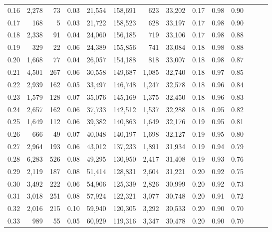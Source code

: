 \begin{tabular}{rrrrrrrrrrrrrr}
0.16 &   2,278 &     73 &  0.03 &   21,554 &  158,691 &     623 &  33,202 &  0.17 &  0.98 &      0.90 \\
0.17 &     168 &      5 &  0.03 &   21,722 &  158,523 &     628 &  33,197 &  0.17 &  0.98 &      0.90 \\
0.18 &   2,338 &     91 &  0.04 &   24,060 &  156,185 &     719 &  33,106 &  0.17 &  0.98 &      0.88 \\
0.19 &     329 &     22 &  0.06 &   24,389 &  155,856 &     741 &  33,084 &  0.18 &  0.98 &      0.88 \\
0.20 &   1,668 &     77 &  0.04 &   26,057 &  154,188 &     818 &  33,007 &  0.18 &  0.98 &      0.87 \\
0.21 &   4,501 &    267 &  0.06 &   30,558 &  149,687 &   1,085 &  32,740 &  0.18 &  0.97 &      0.85 \\
0.22 &   2,939 &    162 &  0.05 &   33,497 &  146,748 &   1,247 &  32,578 &  0.18 &  0.96 &      0.84 \\
0.23 &   1,579 &    128 &  0.07 &   35,076 &  145,169 &   1,375 &  32,450 &  0.18 &  0.96 &      0.83 \\
0.24 &   2,657 &    162 &  0.06 &   37,733 &  142,512 &   1,537 &  32,288 &  0.18 &  0.95 &      0.82 \\
0.25 &   1,649 &    112 &  0.06 &   39,382 &  140,863 &   1,649 &  32,176 &  0.19 &  0.95 &      0.81 \\
0.26 &     666 &     49 &  0.07 &   40,048 &  140,197 &   1,698 &  32,127 &  0.19 &  0.95 &      0.80 \\
0.27 &   2,964 &    193 &  0.06 &   43,012 &  137,233 &   1,891 &  31,934 &  0.19 &  0.94 &      0.79 \\
0.28 &   6,283 &    526 &  0.08 &   49,295 &  130,950 &   2,417 &  31,408 &  0.19 &  0.93 &      0.76 \\
0.29 &   2,119 &    187 &  0.08 &   51,414 &  128,831 &   2,604 &  31,221 &  0.20 &  0.92 &      0.75 \\
0.30 &   3,492 &    222 &  0.06 &   54,906 &  125,339 &   2,826 &  30,999 &  0.20 &  0.92 &      0.73 \\
0.31 &   3,018 &    251 &  0.08 &   57,924 &  122,321 &   3,077 &  30,748 &  0.20 &  0.91 &      0.72 \\
0.32 &   2,016 &    215 &  0.10 &   59,940 &  120,305 &   3,292 &  30,533 &  0.20 &  0.90 &      0.70 \\
0.33 &     989 &     55 &  0.05 &   60,929 &  119,316 &   3,347 &  30,478 &  0.20 &  0.90 &      0.70 \\

\end{tabular}

